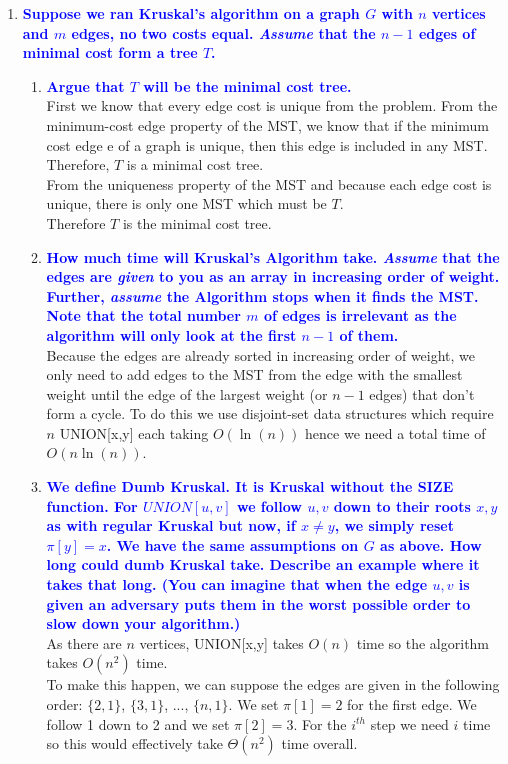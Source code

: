\documentclass[11pt]{article}
\begin{document}
\begin{enumerate}
\item \textbf{\textcolor{blue}{Suppose we ran Kruskal's algorithm on a graph $G$ with $n$ vertices
and $m$ edges, no two costs equal.  {\em Assume} that the $n-1$ edges of
minimal cost form a tree $T$.}}
\begin{enumerate}
    \item \textbf{\textcolor{blue}{Argue that $T$ will be the minimal cost tree.}}
        \\ First we know that every edge cost is unique from the problem. From the minimum-cost edge property of the MST, we know that if the minimum cost edge e of a graph is unique, then this edge is included in any MST. Therefore, $T$ is a minimal cost tree.
        \\ From the uniqueness property of the MST and because each edge cost is unique, there is only one MST which must be $T$.
        \\ Therefore $T$ is the minimal cost tree.
    \item \textbf{\textcolor{blue}{How much time will Kruskal's Algorithm take. {\em Assume} that the
    edges are {\em given} to you as an array in increasing order of weight.
    Further, {\em assume} the Algorithm  stops when
    it finds the MST. Note that the total number $m$ of edges is irrelevant as the
    algorithm will only look at the first $n-1$ of them.}}
        \\ Because the edges are already sorted in increasing order of weight, we only need to add edges to the MST from the edge with the smallest weight until the edge of the largest weight (or $n-1$ edges) that don't form a cycle. To do this we use disjoint-set data structures which require $n$ UNION[x,y] each taking $O(\ln(n))$ hence we need a total time of $O(n\ln(n))$.
    \item \textbf{\textcolor{blue}{We define Dumb Kruskal.  It is Kruskal without the SIZE
    function.  For  $UNION[u,v]$ we follow $u,v$ down to their 
    roots $x,y$ as with regular Kruskal but now, if $x\neq y$,
    we simply reset $\pi[y]=x$.  We have the same
    assumptions on $G$ as above.  How long could dumb Kruskal take.  
    Describe an example where it takes that long.  (You can imagine that
    when the edge $u,v$ is given an adversary puts them in the worst
    possible order to slow down your algorithm.)}}
        \\ As there are $n$ vertices, UNION[x,y] takes $O(n)$ time so the algorithm takes $O(n^2)$ time.
        \\ To make this happen, we can suppose the edges are given in the following order: $\{2,1\}$, $\{3,1\}$, ..., $\{n,1\}$.
        We set $\pi[1] = 2$ for the first edge. We follow 1 down to 2 and we set $\pi[2] = 3$. For the $i^{th}$ step we need $i$ time so this would effectively take $\Theta(n^2)$ time overall.
\end{enumerate}



\end{enumerate}
\end{document}
